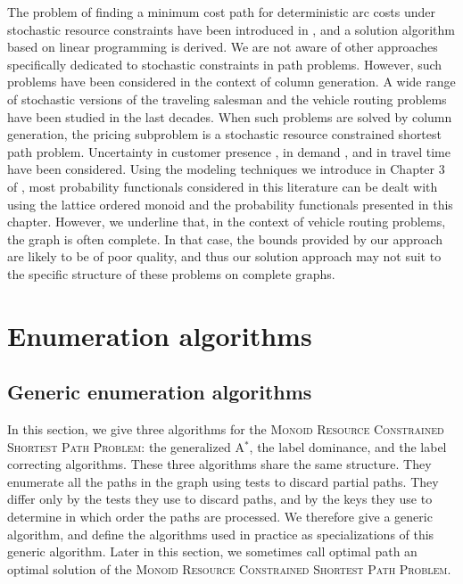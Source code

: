 \documentclass[11pt]{amsart}
\theoremstyle{plain}
\theoremstyle{remark}
\newcommand{\MRCSP}{\textsc{Monoid Resource Constrained Shortest Path Problem}\xspace}
\begin{document}
The problem of finding a minimum cost path for deterministic arc costs under stochastic resource constraints have been introduced in \cite{kosuch2010stochastic}, and a solution algorithm based on linear programming is derived. We are not aware of other approaches specifically dedicated to stochastic constraints in path problems. However, such problems have been considered in the context of column generation. A wide range of stochastic versions of the traveling salesman and the vehicle routing problems have been studied in the last decades. When such problems are solved by column generation, the pricing subproblem is a stochastic resource constrained shortest path problem. Uncertainty in customer presence \cite{jaillet1988priori,jaillet1988probabilistic}, in demand \citep{sungur2008robust,gounaris2013robust,bertsimas1996new,bertsimas1992vehicle}, and in travel time \citep{jaillet2016routing,chang2009stochastic,jula2006truck,li2010vehicle,mazmanyan2009stochastic,russell2008vehicle,tacs2014vehicle,adulyasak2015models} have been considered. Using the modeling techniques we introduce in Chapter 3 of \cite{parmentier2016thesis}, most probability functionals considered in this literature can be dealt with using the lattice ordered monoid and the probability functionals presented in this chapter. However, we underline that, in the context of vehicle routing problems, the graph is often complete. In that case, the bounds provided by our approach are likely to be of poor quality, and thus our solution approach may not suit to the specific structure of these problems on complete graphs.







\section{Enumeration algorithms} \label{sec:enumeration_algorithms}

\subsection{Generic enumeration algorithms} \label{sub:generic_enumeration_algorithms}
In this section, we give three algorithms for the \MRCSP: the generalized A$^{*}$, the label dominance, and the label correcting algorithms. These three algorithms share the same structure. They enumerate all the paths in the graph using tests to discard partial paths. They differ only by the tests they use to discard paths, and by the keys they use to determine in which order the paths are processed. We therefore give a generic algorithm, and define the algorithms used in practice as specializations of this generic algorithm. Later in this section, we sometimes call optimal path an optimal solution of the \MRCSP.
\end{document}
